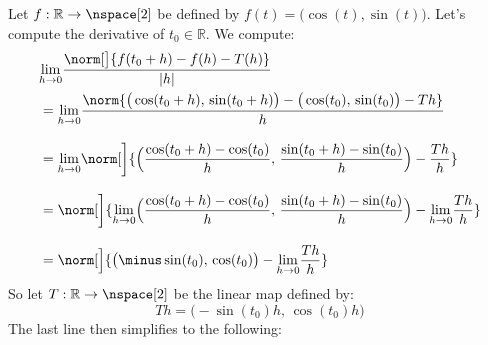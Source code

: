         \begin{example}
            Let $f:\mathbb{R}\rightarrow\nspace[2]$ be defined by
            $f(t)=\big(\cos(t),\sin(t)\big)$. Let's compute the
            derivative of $t_{0}\in\mathbb{R}$. We compute:
            \begin{subequations}
                \begin{align}
                    &\nonumber\underset{h\rightarrow{0}}{\lim}
                        \frac{%
                            \norm[\big]{%
                                f(t_{0}+h)-f(h)-T(h)
                            }
                        }{|h|}\\
                    &=\underset{h\rightarrow{0}}{\lim}
                    \frac{%
                        \norm{%
                            \big(\cos(t_{0}+h),\,\sin(t_{0}+h)\big)-
                            \big(\cos(t_{0}),\,\sin(t_{0})\big)-Th%
                        }%
                    }{h}\\[2ex]
                    &=\underset{h\rightarrow{0}}{\lim}\norm[\bigg]{%
                        \Big(%
                            \frac{\cos(t_{0}+h)-\cos(t_{0})}{h},\,
                            \frac{\sin(t_{0}+h)-\sin(t_{0})}{h}
                        \Big)-\frac{Th}{h}
                    }\\[2ex]
                    &=\norm[\bigg]{%
                        \underset{h\rightarrow{0}}{\lim}\Big(%
                            \frac{\cos(t_{0}+h)-\cos(t_{0})}{h},\,
                            \frac{\sin(t_{0}+h)-\sin(t_{0})}{h}
                        \Big)
                        -\underset{h\rightarrow{0}}{\lim}\frac{Th}{h}
                    }\\[2ex]
                    &=\norm[\Big]{%
                        \big(\minus\sin(t_{0}),\,\cos(t_{0})\big)-
                        \underset{h\rightarrow{0}}{\lim}\frac{Th}{h}
                    }
                \end{align}
            \end{subequations}
            So let $T:\mathbb{R}\rightarrow\nspace[2]$ be the linear map
            defined by:
            \begin{equation}
                Th=\big(\minus\sin(t_{0})h,\,\cos(t_{0})h\big)
            \end{equation}
            The last line then simplifies to the following:
            \begin{subequations}
                \begin{align}

\end{align}
\end{subequations}
\end{example}
